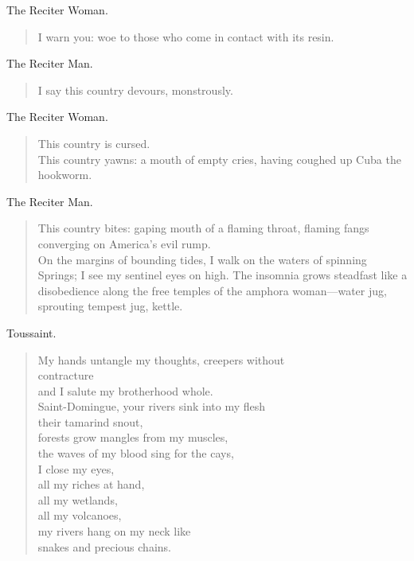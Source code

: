 \documentclass[letterpaper,article,12pt,oneside,notitlepage]{memoir}
\begin{document}
\begin{center}The Reciter Woman.\end{center}

\begin{verse}
I warn you: woe to those who come in contact with its resin. \\
\end{verse}

\begin{center}The Reciter Man.\end{center}

\begin{verse}
I say this country devours, monstrously. \\
\end{verse}

\begin{center}The Reciter Woman.\end{center}

\begin{verse}
This country is cursed. \\
This country yawns: a mouth of empty cries, having coughed up Cuba the hookworm.  \\
\end{verse}

\begin{center}The Reciter Man.\end{center}

\begin{verse}
This country bites: gaping mouth of a flaming throat, flaming fangs converging on America's evil rump. \\
\indent On the margins of bounding tides, I walk on the waters of spinning Springs; I see my sentinel eyes on high. The insomnia grows steadfast like a disobedience along the free temples of the amphora woman---water jug, sprouting tempest jug, kettle. \\
\end{verse}

\clearpage

\begin{center}Toussaint.\end{center}

\begin{verse}
My hands untangle my thoughts, creepers without \\
contracture \\
and I salute my brotherhood whole. \\
Saint-Domingue, your rivers sink into my flesh \\
their tamarind snout, \\
forests grow mangles from my muscles, \\
the waves of my blood sing for the cays, \\
I close my eyes, \\
all my riches at hand, \\
all my wetlands, \\
all my volcanoes, \\
my rivers hang on my neck like \\
snakes and precious chains. \\
\end{verse}
\end{document}
